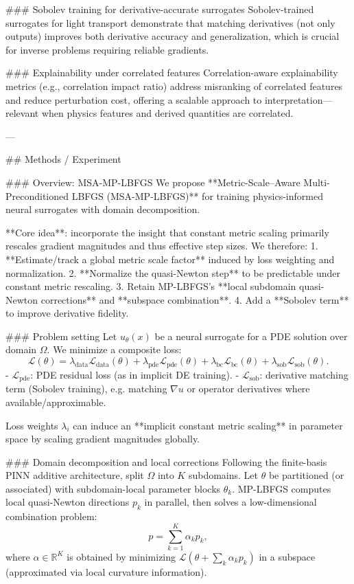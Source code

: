 ### Sobolev training for derivative-accurate surrogates  
Sobolev-trained surrogates for light transport demonstrate that matching derivatives (not only outputs) improves both derivative accuracy and generalization, which is crucial for inverse problems requiring reliable gradients.

### Explainability under correlated features  
Correlation-aware explainability metrics (e.g., correlation impact ratio) address misranking of correlated features and reduce perturbation cost, offering a scalable approach to interpretation—relevant when physics features and derived quantities are correlated.

---

## Methods / Experiment  

### Overview: MSA-MP-LBFGS  
We propose **Metric-Scale–Aware Multi-Preconditioned LBFGS (MSA-MP-LBFGS)** for training physics-informed neural surrogates with domain decomposition.

**Core idea**: incorporate the insight that constant metric scaling primarily rescales gradient magnitudes and thus effective step sizes. We therefore:
1. **Estimate/track a global metric scale factor** induced by loss weighting and normalization.  
2. **Normalize the quasi-Newton step** to be predictable under constant metric rescaling.  
3. Retain MP-LBFGS’s **local subdomain quasi-Newton corrections** and **subspace combination**.  
4. Add a **Sobolev term** to improve derivative fidelity.

### Problem setting  
Let \(u_\theta(x)\) be a neural surrogate for a PDE solution over domain \(\Omega\). We minimize a composite loss:
\[
\mathcal{L}(\theta)=\lambda_{\text{data}}\mathcal{L}_{\text{data}}(\theta)+
\lambda_{\text{pde}}\mathcal{L}_{\text{pde}}(\theta)+
\lambda_{\text{bc}}\mathcal{L}_{\text{bc}}(\theta)+
\lambda_{\text{sob}}\mathcal{L}_{\text{sob}}(\theta).
\]
- \(\mathcal{L}_{\text{pde}}\): PDE residual loss (as in implicit DE training).  
- \(\mathcal{L}_{\text{sob}}\): derivative matching term (Sobolev training), e.g. matching \(\nabla u\) or operator derivatives where available/approximable.

Loss weights \(\lambda_i\) can induce an **implicit constant metric scaling** in parameter space by scaling gradient magnitudes globally.

### Domain decomposition and local corrections  
Following the finite-basis PINN additive architecture, split \(\Omega\) into \(K\) subdomains. Let \(\theta\) be partitioned (or associated) with subdomain-local parameter blocks \(\theta_k\). MP-LBFGS computes local quasi-Newton directions \(p_k\) in parallel, then solves a low-dimensional combination problem:
\[
p = \sum_{k=1}^K \alpha_k p_k,
\]
where \(\alpha\in\mathbb{R}^K\) is obtained by minimizing \(\mathcal{L}(\theta + \sum_k \alpha_k p_k)\) in a subspace (approximated via local curvature information).

